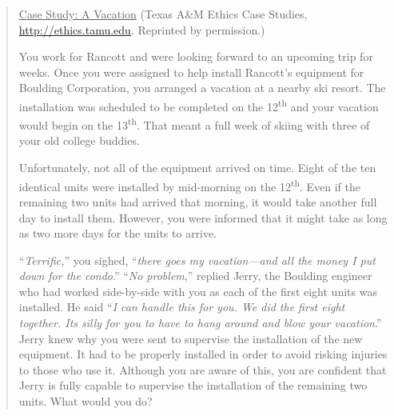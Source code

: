 \begin{quote}
\ul{Case Study: A Vacation} (Texas A\&M Ethics Case Studies,
\url{http://ethics.tamu.edu}. Reprinted by permission.)

You work for Rancott and were looking forward to an upcoming trip for
weeks. Once you were assigned to help install Rancott's equipment for
Boulding Corporation, you arranged a vacation at a nearby ski resort.
The installation was scheduled to be completed on the
12\textsuperscript{th} and your vacation would begin on the
13\textsuperscript{th}. That meant a full week of skiing with three of
your old college buddies.

Unfortunately, not all of the equipment arrived on time. Eight of the
ten identical units were installed by mid-morning on the
12\textsuperscript{th}. Even if the remaining two units had arrived that
morning, it would take another full day to install them. However, you
were informed that it might take as long as two more days for the units
to arrive.

``\emph{Terrific,}'' you sighed, ``\emph{there goes my vacation---and
all the money I put down for the condo}.'' ``\emph{No problem},''
replied Jerry, the Boulding engineer who had worked side-by-side with
you as each of the first eight units was installed. He said ``\emph{I
can handle this for you. We did the first eight together.
It\textquotesingle s silly for you to have to hang around and blow your
vacation}.'' Jerry knew why you were sent to supervise the installation
of the new equipment. It had to be properly installed in order to avoid
risking injuries to those who use it. Although you are aware of this,
you are confident that Jerry is fully capable to supervise the
installation of the remaining two units. What would you do?
\end{quote}
